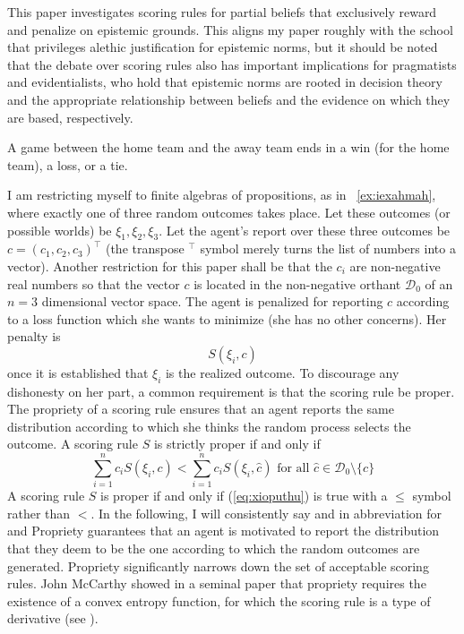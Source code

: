 \documentclass[12pt]{article}
\begin{document}
This paper investigates scoring rules for partial beliefs that
exclusively reward and penalize on epistemic grounds. This aligns my
paper roughly with the school that privileges alethic justification
for epistemic norms, but it should be noted that the debate over
scoring rules also has important implications for pragmatists and
evidentialists, who hold that epistemic norms are rooted in decision
theory and the appropriate relationship between beliefs and the
evidence on which they are based, respectively.

\begin{quotex}
  \label{ex:iexahmah} A game between the home
  team and the away team ends in a win (for the home team), a loss, or
  a tie.
\end{quotex}

I am restricting myself to finite algebras of propositions, as in
{\xample}~\ref{ex:iexahmah}, where exactly one of three random
outcomes takes place. Let these outcomes (or possible worlds) be
$\xi_{1},\xi_{2},\xi_{3}$. Let the agent's report over these three
outcomes be $c=(c_{1},c_{2},c_{3})^{\intercal}$ (the transpose
$^{\intercal}$ symbol merely turns the list of numbers into a vector).
Another restriction for this paper shall be that the $c_{i}$ are
non-negative real numbers so that the vector $c$ is located in the
non-negative orthant $\mathcal{D}_{0}$ of an $n=3$ dimensional vector
space. The agent is penalized for reporting $c$ according to a loss
function which she wants to minimize (she has no other concerns). Her
penalty is
\begin{equation}
  \label{eq:choirail}
  S(\xi_{i},c)
\end{equation}
once it is established that $\xi_{i}$ is the realized outcome. To
discourage any dishonesty on her part, a common requirement is that
the scoring rule be proper. The propriety of a scoring rule ensures
that an agent reports the same distribution according to which she
thinks the random process selects the outcome. A scoring rule $S$ is
strictly proper if and only if
\begin{equation}
  \label{eq:xioputhu}
  \sum_{i=1}^{n}c_{i}S(\xi_{i},c)<\sum_{i=1}^{n}c_{i}S(\xi_{i},\hat{c})\mbox{ for all }\hat{c}\in\mathcal{D}_{0}\setminus\{c\}
\end{equation}
A scoring rule $S$ is proper if and only if (\ref{eq:xioputhu}) is
true with a $\leq$ symbol rather than $<$. In the following, I will
consistently say  and  in abbreviation
for  and  Propriety
guarantees that an agent is motivated to report the distribution that
they deem to be the one according to which the random outcomes are
generated. Propriety significantly narrows down the set of acceptable
scoring rules. John McCarthy showed in a seminal paper that propriety
requires the existence of a convex entropy function, for which the
scoring rule is a type of derivative (see ).
\end{document}
